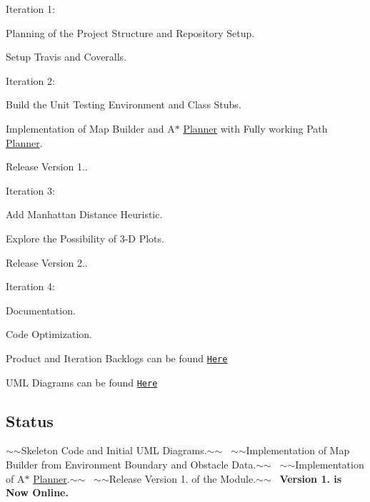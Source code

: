 \begin{DoxyEnumerate}
\item Iteration 1\+:
\begin{DoxyItemize}
\item Planning of the Project Structure and Repository Setup.
\item Setup Travis and Coveralls.
\end{DoxyItemize}
\item Iteration 2\+:
\begin{DoxyItemize}
\item Build the Unit Testing Environment and Class Stubs.
\item Implementation of Map Builder and A$\ast$ \hyperlink{classPlanner}{Planner} with Fully working Path \hyperlink{classPlanner}{Planner}.
\item Release Version 1..
\end{DoxyItemize}
\item Iteration 3\+:
\begin{DoxyItemize}
\item Add Manhattan Distance Heuristic.
\item Explore the Possibility of 3-\/D Plots.
\item Release Version 2..
\end{DoxyItemize}
\item Iteration 4\+:
\begin{DoxyItemize}
\item Documentation.
\item Code Optimization.
\end{DoxyItemize}
\end{DoxyEnumerate}

Product and Iteration Backlogs can be found \href{https://docs.google.com/spreadsheets/d/1OG3C1JBhDQzr5JbrNKvgw2EXLqxJdgZZMIk44BRrPIw/edit?usp=sharing}{\tt Here}

U\+ML Diagrams can be found \href{https://github.com/VBot2410/A_Star_3D/tree/master/UML}{\tt Here}

\subsection*{Status}

$\sim$$\sim$\+Skeleton Code and Initial U\+ML Diagrams.$\sim$$\sim$~\newline
 $\sim$$\sim$\+Implementation of Map Builder from Environment Boundary and Obstacle Data.$\sim$$\sim$~\newline
 $\sim$$\sim$\+Implementation of A$\ast$ \hyperlink{classPlanner}{Planner}.$\sim$$\sim$~\newline
 $\sim$$\sim$\+Release Version 1. of the Module.$\sim$$\sim$~\newline
 {\bfseries Version 1. is Now Online.}

